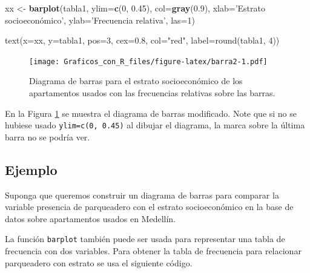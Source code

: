 \documentclass[10pt,]{krantz}
\makeatletter
\newenvironment{Shaded}{\begin{snugshade}}{\end{snugshade}}
\newcommand{\KeywordTok}[1]{\textcolor[rgb]{0.13,0.29,0.53}{\textbf{#1}}}
\newcommand{\DataTypeTok}[1]{\textcolor[rgb]{0.13,0.29,0.53}{#1}}
\newcommand{\DecValTok}[1]{\textcolor[rgb]{0.00,0.00,0.81}{#1}}
\newcommand{\FloatTok}[1]{\textcolor[rgb]{0.00,0.00,0.81}{#1}}
\newcommand{\StringTok}[1]{\textcolor[rgb]{0.31,0.60,0.02}{#1}}
\newcommand{\OperatorTok}[1]{\textcolor[rgb]{0.81,0.36,0.00}{\textbf{#1}}}
\newcommand{\NormalTok}[1]{#1}
\newenvironment{kframe}{%
\medskip{}
\setlength{\fboxsep}{.8em}
 \def\at@end@of@kframe{}%
 \ifinner\ifhmode%
  \def\at@end@of@kframe{\end{minipage}}%
  \begin{minipage}{\columnwidth}%
 \fi\fi%
 \def\FrameCommand##1{\hskip\@totalleftmargin \hskip-\fboxsep
 \colorbox{shadecolor}{##1}\hskip-\fboxsep
     \hskip-\linewidth \hskip-\@totalleftmargin \hskip\columnwidth}%
 \MakeFramed {\advance\hsize-\width
   \@totalleftmargin\z@ \linewidth\hsize
   \@setminipage}}%
 {\par\unskip\endMakeFramed%
 \at@end@of@kframe}
\renewenvironment{Shaded}{\begin{kframe}}{\end{kframe}}
\makeatother
\begin{document}
\begin{Shaded}
\begin{Highlighting}[]
\NormalTok{xx <-}\StringTok{ }\KeywordTok{barplot}\NormalTok{(tabla1, }\DataTypeTok{ylim=}\KeywordTok{c}\NormalTok{(}\DecValTok{0}\NormalTok{, }\FloatTok{0.45}\NormalTok{), }\DataTypeTok{col=}\KeywordTok{gray}\NormalTok{(}\FloatTok{0.9}\NormalTok{),}
              \DataTypeTok{xlab=}\StringTok{'Estrato socioeconómico',}
\StringTok{              ylab='}\NormalTok{Frecuencia relativa}\StringTok{', las=1)}

\StringTok{text(x=xx, y=tabla1, pos=3, cex=0.8, col="red",}
\StringTok{     label=round(tabla1, 4))}
\end{Highlighting}
\end{Shaded}

\begin{figure}
\centering
\texttt{[image: Graficos\_con\_R\_files/figure-latex/barra2-1.pdf]}
\caption{\label{fig:barra2}Diagrama de barras para el estrato socioeconómico
de los apartamentos usados con las frecuencias relativas sobre las
barras.}
\end{figure}

En la Figura \ref{fig:barra2} se muestra el diagrama de barras
modificado. Note que si no se hubiese usado \texttt{ylim=c(0,\ 0.45)} al
dibujar el diagrama, la marca sobre la última barra no se podría ver.

\subsection*{Ejemplo}\label{ejemplo-29}


Suponga que queremos construir un diagrama de barras para comparar la
variable presencia de parqueadero con el estrato socioeconómico en la
base de datos sobre apartamentos usados en Medellín.

La función \texttt{barplot} también puede ser usada para representar una
tabla de frecuencia con dos variables. Para obtener la tabla de
frecuencia para relacionar parqueadero con estrato se usa el siguiente
código.

\begin{Shaded}
\end{Shaded}
\end{document}
